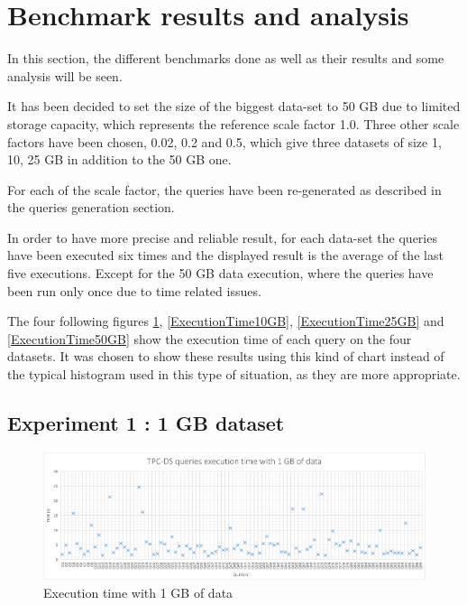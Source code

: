 \documentclass{article}
\begin{document}
\section{Benchmark results and analysis}

In this section, the different benchmarks done as well as their results and some analysis will be seen.

It has been decided to set the size of the biggest data-set to 50 GB due to limited storage capacity, which represents the reference scale factor 1.0. Three other scale factors have been chosen, 0.02, 0.2 and 0.5, which give three datasets of size 1, 10, 25 GB in addition to the 50 GB one.

For each of the scale factor, the queries have been re-generated as described in the queries generation section.

In order to have more precise and reliable result, for each data-set the queries have been executed six times and the displayed result is the average of the last five executions. Except for the 50 GB data execution, where the queries have been run only once due to time related issues.

The four following figures \ref{ExecutionTime1GB}, \ref{ExecutionTime10GB}, \ref{ExecutionTime25GB} and \ref{ExecutionTime50GB} show the execution time of each query on the four datasets. It was chosen to show these results using this kind of chart instead of the typical histogram used in this type of situation, as they are more appropriate.

\subsection{Experiment 1 : 1 GB dataset}

\begin{figure}[H] 
\begin{adjustwidth}{-2cm}{-2cm}
\begin{center}
\includegraphics[width=20cm]{images/ExecutionTime1GB.png}
\end{center}
\end{adjustwidth}
\caption{Execution time with 1 GB of data}
\label{ExecutionTime1GB}
\end{figure}
\end{document}
